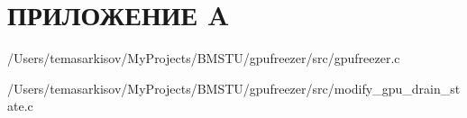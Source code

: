 \chapter*{ПРИЛОЖЕНИЕ A}

\begin{lstinputlisting}[
	caption={Исходный код программы},
	label={lst:source},
	style={c},
	]{/Users/temasarkisov/MyProjects/BMSTU/gpufreezer/src/gpufreezer.c}
\end{lstinputlisting}

\begin{lstinputlisting}[
	caption={Исходный код программы},
	label={lst:source},
	style={c},
	]{/Users/temasarkisov/MyProjects/BMSTU/gpufreezer/src/modify_gpu_drain_state.c}
\end{lstinputlisting}

\pagebreak